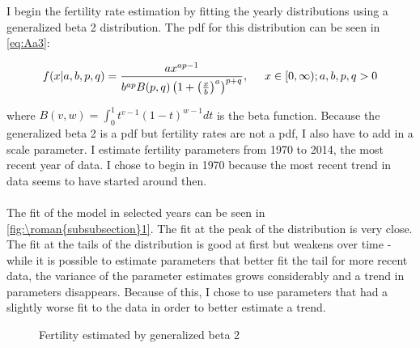 \documentclass{article}
\renewcommand{\thesubsubsection}{\roman{subsubsection}}
\numberwithin{equation}{subsection}
\renewcommand{\subsubsection}[2][]{\oldsubsubsection[#1]{#2}\index{#1}\label{sec:\thesubsubsection}}
\newcommand*{\FigureDir}{../../graphs}
\begin{document}
\begin{appendices}
\subsubsection{Fertility}

I begin the fertility rate estimation by fitting the yearly distributions using a generalized beta 2 distribution. The pdf for this distribution can be seen in \ref{eq:Aa3}:

\begin{equation}
   f(x|a, b, p, q) = \frac{ax^{ap-1}}{b^{ap}B(p,q)\left(1 + \left(\frac{x}{b}\right)^a\right)^{p+q}}, \hspace{5mm} x \in [0,\infty); a, b, p, q > 0   
\end{equation}

\noindent
where \(B(v,w) = \int_0^1 t^{v-1}(1-t)^{w-1}dt\) is the beta function. Because the generalized beta 2 is a pdf but fertility rates are not a pdf, I also have to add in a scale parameter. I estimate fertility parameters from 1970 to 2014, the most recent year of data. I chose to begin in 1970 because the most recent trend in data seems to have started around then.
\\\\
The fit of the model in selected years can be seen in \autoref{fig:\thesubsubsection1}. The fit at the peak of the distribution is very close. The fit at the tails of the distribution is good at first but weakens over time - while it is possible to estimate parameters that better fit the tail for more recent data, the variance of the parameter estimates grows considerably and a trend in parameters disappears. Because of this, I chose to use parameters that had a slightly worse fit to the data in order to better estimate a trend.

\begin{figure}[H]
   \centering
   \caption{\label{fig:\thesubsubsection1}Fertility estimated by generalized beta 2}
\end{figure}


\end{appendices}
\end{document}
